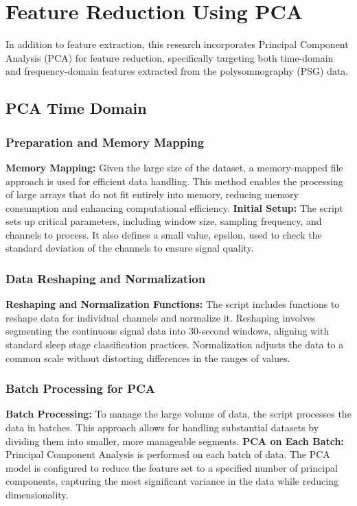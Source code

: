 \documentclass[12pt, a4paper,oneside]{book}
\numberwithin{equation}{section}
\begin{document}
\section{Feature Reduction Using PCA}
In addition to feature extraction, this research incorporates Principal Component Analysis (PCA) for feature reduction, specifically targeting both time-domain and frequency-domain features extracted from the polysomnography (PSG) data. 
\subsection{PCA Time Domain}
\subsubsection{Preparation and Memory Mapping}
\textbf{Memory Mapping:} Given the large size of the dataset, a memory-mapped file approach is used for efficient data handling. This method enables the processing of large arrays that do not fit entirely into memory, reducing memory consumption and enhancing computational efficiency.
\textbf{Initial Setup: }The script sets up critical parameters, including window size, sampling frequency, and channels to process. It also defines a small value, epsilon, used to check the standard deviation of the channels to ensure signal quality.
\subsubsection{Data Reshaping and Normalization}
\textbf{Reshaping and Normalization Functions:} The script includes functions to reshape data for individual channels and normalize it. Reshaping involves segmenting the continuous signal data into 30-second windows, aligning with standard sleep stage classification practices. Normalization adjusts the data to a common scale without distorting differences in the ranges of values.
\subsubsection{Batch Processing for PCA}
\textbf{Batch Processing:} To manage the large volume of data, the script processes the data in batches. This approach allows for handling substantial datasets by dividing them into smaller, more manageable segments.
\textbf{PCA on Each Batch:} Principal Component Analysis is performed on each batch of data. The PCA model is configured to reduce the feature set to a specified number of principal components, capturing the most significant variance in the data while reducing dimensionality.
\end{document}
